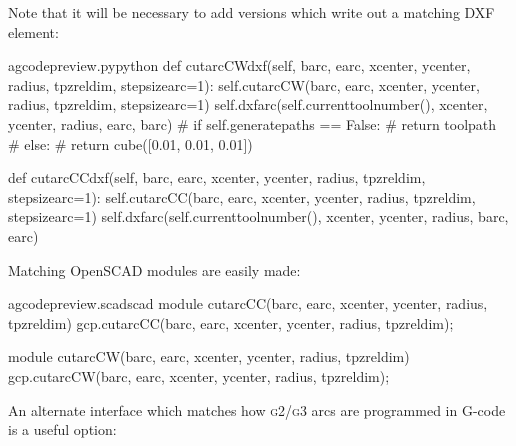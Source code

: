 \documentclass{ltxdoc}
\begin{document}
Note that it will be necessary to add versions which write out a matching DXF element:


\lstset{firstnumber=\thegcpy}
\begin{writecode}{a}{gcodepreview.py}{python}
    def cutarcCWdxf(self, barc, earc, xcenter, ycenter, radius, tpzreldim, stepsizearc=1):
        self.cutarcCW(barc, earc, xcenter, ycenter, radius, tpzreldim, stepsizearc=1)
        self.dxfarc(self.currenttoolnumber(), xcenter, ycenter, radius, earc, barc)
#        if self.generatepaths == False:
#        return toolpath
#        else:
#            return cube([0.01, 0.01, 0.01])

    def cutarcCCdxf(self, barc, earc, xcenter, ycenter, radius, tpzreldim, stepsizearc=1):
        self.cutarcCC(barc, earc, xcenter, ycenter, radius, tpzreldim, stepsizearc=1)
        self.dxfarc(self.currenttoolnumber(), xcenter, ycenter, radius, barc, earc)

\end{writecode}
\addtocounter{gcpy}{8}

Matching OpenSCAD modules are easily made:

\lstset{firstnumber=\thegcpscad}
\begin{writecode}{a}{gcodepreview.scad}{scad}
module cutarcCC(barc, earc, xcenter, ycenter, radius, tpzreldim){
    gcp.cutarcCC(barc, earc, xcenter, ycenter, radius, tpzreldim);
}

module cutarcCW(barc, earc, xcenter, ycenter, radius, tpzreldim){
    gcp.cutarcCW(barc, earc, xcenter, ycenter, radius, tpzreldim);
}

\end{writecode}
\addtocounter{gcpscad}{8}

An alternate interface which matches how \textsc{g2/g3} arcs are programmed in G-code is a useful option:
\end{document}
